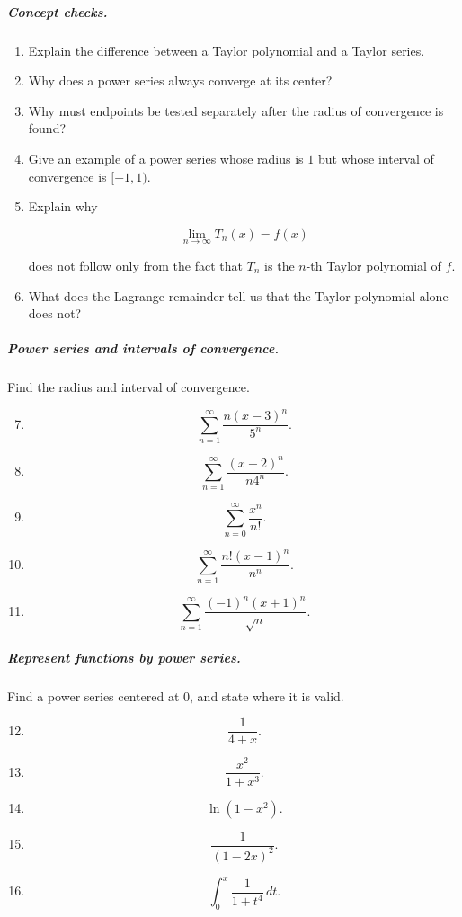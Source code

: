 \subparagraph{Concept checks.}
\begin{enumerate}
\item Explain the difference between a Taylor polynomial and a Taylor series.

\item Why does a power series always converge at its center?

\item Why must endpoints be tested separately after the radius of convergence is found?

\item Give an example of a power series whose radius is \(1\) but whose interval of
convergence is \([-1,1)\).

\item Explain why

\[
\lim_{n\to\infty}T_n(x)=f(x)
\]

does not follow only from the fact that \(T_n\) is the \(n\)-th Taylor polynomial of \(f\).

\item What does the Lagrange remainder tell us that the Taylor polynomial alone does not?
\end{enumerate}

\subparagraph{Power series and intervals of convergence.}
Find the radius and interval of convergence.

\begin{enumerate}
\setcounter{enumi}{6}

\item
\[
\sum_{n=1}^{\infty} \frac{n(x-3)^n}{5^n}.
\]

\item
\[
\sum_{n=1}^{\infty}\frac{(x+2)^n}{n4^n}.
\]

\item
\[
\sum_{n=0}^{\infty}\frac{x^n}{n!}.
\]

\item
\[
\sum_{n=1}^{\infty}\frac{n!(x-1)^n}{n^n}.
\]

\item
\[
\sum_{n=1}^{\infty}\frac{(-1)^n(x+1)^n}{\sqrt n}.
\]
\end{enumerate}

\subparagraph{Represent functions by power series.}
Find a power series centered at \(0\), and state where it is valid.

\begin{enumerate}
\setcounter{enumi}{11}

\item
\[
\frac1{4+x}.
\]

\item
\[
\frac{x^2}{1+x^3}.
\]

\item
\[
\ln(1-x^2).
\]

\item
\[
\frac1{(1-2x)^2}.
\]

\item
\[
\int_0^x \frac{1}{1+t^4}\,dt.
\]
\end{enumerate}

